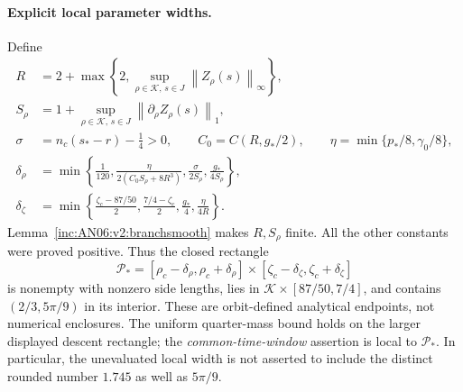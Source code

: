 \documentclass[11pt]{article}
\numberwithin{equation}{section}
\theoremstyle{remark}\newtheorem{remark}[theorem]{Remark}
\newcommand{\1}{\mathbf 1}
\newcommand{\norm}[1]{\left\lVert#1\right\rVert}
\begin{document}
\paragraph{Explicit local parameter widths.}
Define
\begin{align}
 R&=2+\max\left\{2,\sup_{\rho\in\mathcal K,\,s\in J}
                  \norm{Z_\rho(s)}_\infty\right\},\nonumber\\
 S_\rho&=1+\sup_{\rho\in\mathcal K,\,s\in J}
                  \norm{\partial_\rho Z_\rho(s)}_1,\nonumber\\
 \sigma&=n_c(s_*-r)-\tfrac14>0,\qquad
 C_0=C(R,g_*/2),\qquad \eta=\min\{p_*/8,\gamma_0/8\},
 \label{inc:AN06:v2:constants}\\
 \delta_\rho&=\min\left\{\frac1{120},
   \frac{\eta}{2(C_0S_\rho+8R^3)},
   \frac{\sigma}{2S_\rho},\frac{g_*}{4S_\rho}\right\},\nonumber\\
 \delta_\zeta&=\min\left\{\frac{\zeta_c-87/50}{2},
                \frac{7/4-\zeta_c}{2},\frac{g_*}{4},\frac{\eta}{4R}\right\}.
 \nonumber
\end{align}
Lemma~\ref{inc:AN06:v2:branchsmooth} makes $R,S_\rho$ finite. All the
other constants were proved positive. Thus the closed rectangle
\begin{equation}\label{inc:AN06:v2:rectangle}
 \mathcal P_*=[\rho_c-\delta_\rho,\rho_c+\delta_\rho]
 \times[\zeta_c-\delta_\zeta,\zeta_c+\delta_\zeta]
\end{equation}
is nonempty with nonzero side lengths, lies in
$\mathcal K\times[87/50,7/4]$, and contains $(2/3,5\pi/9)$ in its interior.
These are orbit-defined analytical endpoints, not numerical enclosures.
The uniform quarter-mass bound holds on the larger displayed descent
rectangle; the \emph{common-time-window} assertion is local to
$\mathcal P_*$. In particular, the unevaluated local width is not asserted
to include the distinct rounded number $1.745$ as well as $5\pi/9$.
\end{document}

